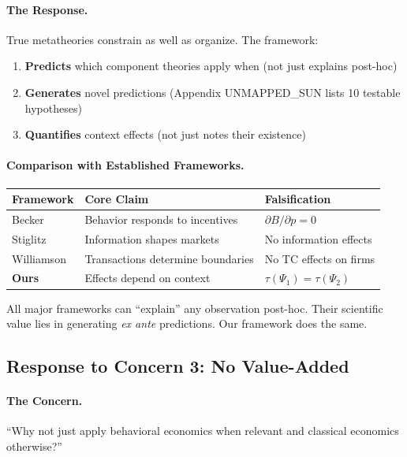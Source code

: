 \paragraph{The Response.}
True metatheories constrain as well as organize. The framework:
\begin{enumerate}
    \item \textbf{Predicts} which component theories apply when (not just explains post-hoc)
    \item \textbf{Generates} novel predictions (Appendix UNMAPPED_SUN lists 10 testable hypotheses)
    \item \textbf{Quantifies} context effects (not just notes their existence)
\end{enumerate}

\paragraph{Comparison with Established Frameworks.}

\begin{center}
\renewcommand{\arraystretch}{1.3}
\begin{tabular}{lll}
\hline
\textbf{Framework} & \textbf{Core Claim} & \textbf{Falsification} \\
\hline
Becker & Behavior responds to incentives & $\partial B/\partial p = 0$ \\
Stiglitz & Information shapes markets & No information effects \\
Williamson & Transactions determine boundaries & No TC effects on firms \\
\textbf{Ours} & Effects depend on context & $\tau(\Psi_1) = \tau(\Psi_2)$ \\
\hline
\end{tabular}
\end{center}

All major frameworks can ``explain'' any observation post-hoc. Their scientific value lies in generating \textit{ex ante} predictions. Our framework does the same.

\subsection{Response to Concern 3: No Value-Added}

\paragraph{The Concern.}
``Why not just apply behavioral economics when relevant and classical economics otherwise?''

